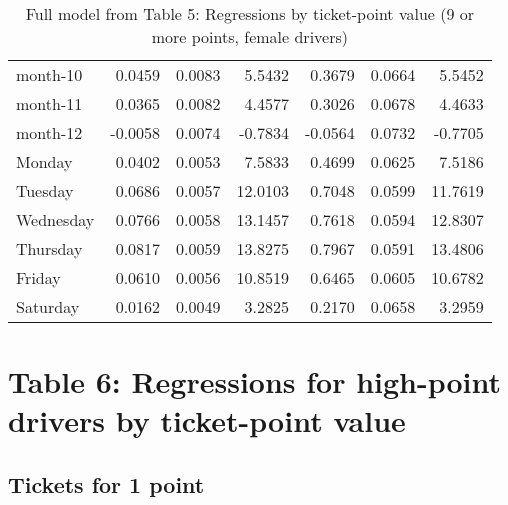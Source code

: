 \documentclass[10pt]{article}
\begin{document}
\begin{table}[ht]
\begin{tabular}{lrrrrrr}
  month-10 & 0.0459 & 0.0083 & 5.5432 & 0.3679 & 0.0664 & 5.5452 \\ 
  month-11 & 0.0365 & 0.0082 & 4.4577 & 0.3026 & 0.0678 & 4.4633 \\ 
  month-12 & -0.0058 & 0.0074 & -0.7834 & -0.0564 & 0.0732 & -0.7705 \\ 
  Monday & 0.0402 & 0.0053 & 7.5833 & 0.4699 & 0.0625 & 7.5186 \\ 
  Tuesday & 0.0686 & 0.0057 & 12.0103 & 0.7048 & 0.0599 & 11.7619 \\ 
  Wednesday & 0.0766 & 0.0058 & 13.1457 & 0.7618 & 0.0594 & 12.8307 \\ 
  Thursday & 0.0817 & 0.0059 & 13.8275 & 0.7967 & 0.0591 & 13.4806 \\ 
  Friday & 0.0610 & 0.0056 & 10.8519 & 0.6465 & 0.0605 & 10.6782 \\ 
  Saturday & 0.0162 & 0.0049 & 3.2825 & 0.2170 & 0.0658 & 3.2959 \\ 
   \hline
\end{tabular}
\caption{Full model from Table 5: Regressions by ticket-point value (9 or more points, female drivers)} 
\label{tab_5_9plus_pts_no_age_F}
\end{table}


\clearpage
\pagebreak




\section{Table 6: Regressions for high-point drivers by ticket-point value}




\subsection{Tickets for 1 point}



\end{document}

